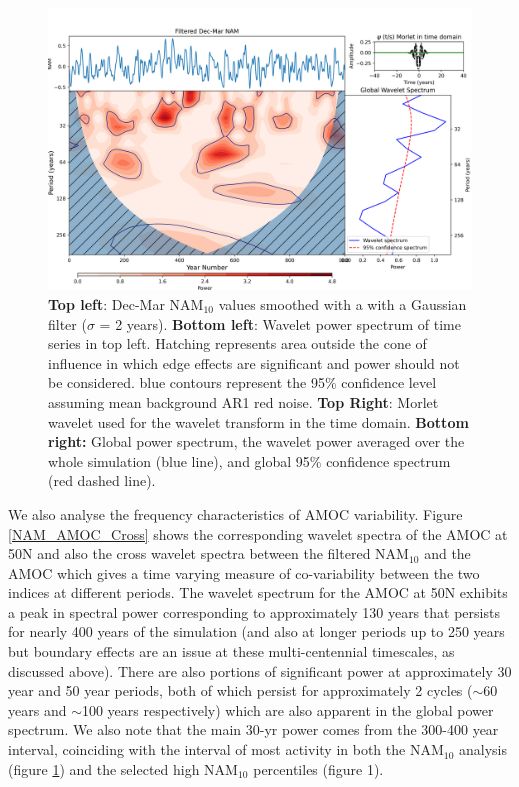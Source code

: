 \begin{figure}[h!]
\begin{center}
\noindent\includegraphics[width = 0.8\linewidth]{Figures/Figures-surface/NAM_wavelet_UKESM.png}
\caption[Wavelet power spectrum of smoothed NAM$_{10}$ index]{\textbf{Top left}: Dec-Mar NAM$_{10}$ values smoothed with a with a Gaussian filter ($\sigma$ = 2 years). \textbf{Bottom left}: Wavelet power spectrum of time series in top left. Hatching represents area outside the cone of influence in which edge effects are significant and power should not be considered. blue contours represent the 95\% confidence level assuming mean background AR1 red noise. \textbf{Top Right}: Morlet wavelet used for the wavelet transform in the time domain. \textbf{Bottom right:} Global power spectrum, the wavelet power averaged over the whole simulation (blue line), and global 95\% confidence spectrum (red dashed line).}
\label{NAM_wavelet}
\end{center}
\end{figure}

We also analyse the frequency characteristics of AMOC variability. Figure \ref{NAM_AMOC_Cross} shows the corresponding wavelet spectra of the AMOC at 50N and also the cross wavelet spectra between the filtered NAM$_{10}$ and the AMOC which gives a time varying measure of co-variability between the two indices at different periods. The wavelet spectrum for the AMOC at 50N exhibits a peak in spectral power corresponding to approximately 130 years that persists for nearly 400 years of the simulation (and also at longer periods up to 250 years but boundary effects are an issue at these multi-centennial timescales, as discussed above). There are also portions of significant power at approximately 30 year and 50 year periods, both of which persist for approximately 2 cycles ($\sim$60 years and $\sim$100 years respectively) which are also apparent in the global power spectrum. We also note that the main 30-yr power comes from the 300-400 year interval, coinciding with the interval of most activity in both the NAM$_{10}$ analysis (figure \ref{NAM_wavelet}) and the selected high NAM$_{10}$ percentiles (figure 1). 
 
